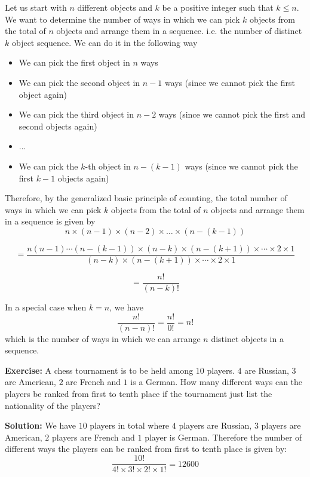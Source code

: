 \begin{keyconceptbox}
Let us start with \(n\) different objects and \(k\) be a positive integer such that \(k \leq n\). We want to determine the number of ways in which we can pick \(k\) objects from the total of \(n\) objects and arrange them in a sequence. i.e. the number of distinct \(k\) object sequence. We can do it in the following way 

\begin{itemize}
    \item We can pick the first object in \(n\) ways
    \item We can pick the second object in \(n-1\) ways (since we cannot pick the first object again)
    \item We can pick the third object in \(n-2\) ways (since we cannot pick the first and second objects again)
    \item ...
    \item We can pick the \(k\)-th object in \(n-(k-1)\) ways (since we cannot pick the first \(k-1\) objects again)
\end{itemize}

Therefore, by the generalized basic principle of counting, the total number of ways in which we can pick \(k\) objects from the total of \(n\) objects and arrange them in a sequence is given by
\[ 
    n \times (n-1) \times (n-2) \times \ldots \times (n-(k-1)) 
\]

\[
    = \frac{n(n-1)\cdots(n-(k-1))\times (n-k) \times (n-(k+1)) \times \cdots \times 2 \times 1}{(n-k) \times (n-(k+1)) \times \cdots \times 2 \times 1} 
\]

\[
= \frac{n!}{(n-k)!}
\]

In a special case when \(k=n\), we have
\[ \frac{n!}{(n-n)!} = \frac{n!}{0!} = n! \]
which is the number of ways in which we can arrange \(n\) distinct objects in a sequence.
\end{keyconceptbox}
\begin{exercisebox}
    \textbf{Exercise:} A chess tournament is to be held among \(10\) players. \(4\) are Russian, \(3\) are American, \(2\) are French and \(1\) is a German. How many different ways can the players be ranked from first to tenth place if the tournament just list the nationality of the players?
\end{exercisebox}


\begin{solutionbox}
    \textbf{Solution:} We have \(10\) players in total where \(4\) players are Russian, \(3\) players are American, \(2\) players are French and \(1\) player is German. Therefore the number of different ways the players can be ranked from first to tenth place is given by:
    \[ \frac{10!}{4! \times 3! \times 2! \times 1!} = 12600 \]
\end{solutionbox}

